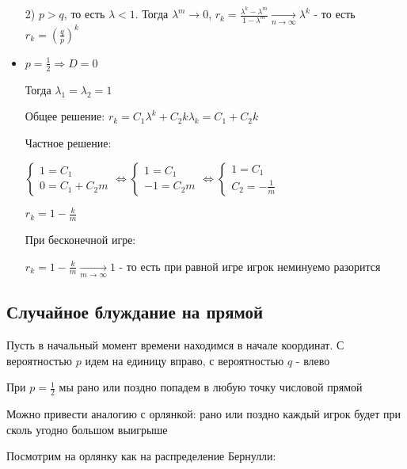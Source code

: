 \documentclass[12pt]{article}
\begin{document}
\begin{itemize}
        2) $p > q$, то есть $\lambda < 1$. Тогда $\lambda^m \to 0$, $r_k = \frac{\lambda^k - \lambda^m}{1 - \lambda^m} \underset{n \to \infty}{\longrightarrow} \lambda^k$ - 
        то есть $r_k = \left(\frac{q}{p}\right)^k$

        \item $p = \frac{1}{2} \Longrightarrow D = 0$ 

        Тогда $\lambda_1 = \lambda_2 = 1$

        Общее решение: $r_k = C_1 \lambda^k + C_2 k \lambda_k = C_1 + C_2 k$

        Частное решение: 
        
        $\begin{cases}
            1 = C_1 \\
            0 = C_1 + C_2 m
        \end{cases} \Longleftrightarrow \begin{cases}
            1 = C_1 \\
            -1 = C_2 m
        \end{cases} \Longleftrightarrow \begin{cases}
            1 = C_1 \\
            C_2 = -\frac{1}{m}
        \end{cases}$

        $r_k = 1 - \frac{k}{m}$

        При бесконечной игре:

        $r_k = 1 - \frac{k}{m} \underset{m \to \infty}{\longrightarrow} 1$ - то есть при равной игре игрок неминуемо разорится 

    \end{itemize}

    \subsection{Случайное блуждание на прямой}

    Пусть в начальный момент времени находимся в начале координат. С вероятностью $p$ идем на единицу вправо, с вероятностью $q$ - влево

    При $p = \frac{1}{2}$ мы рано или поздно попадем в любую точку числовой прямой

    Можно привести аналогию с орлянкой: рано или поздно каждый игрок будет при сколь угодно большом выигрыше

    Посмотрим на орлянку как на распределение Бернулли:

    \smallvspace
\end{document}
